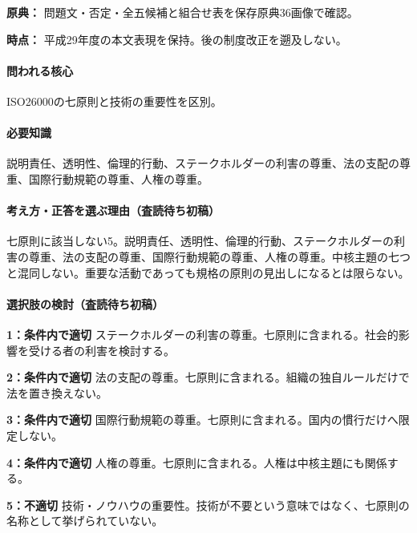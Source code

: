 \noindent\textbf{原典：} 問題文・否定・全五候補と組合せ表を保存原典36画像で確認。\par

\noindent\textbf{時点：} 平成29年度の本文表現を保持。後の制度改正を遡及しない。\par

\paragraph{問われる核心} ISO26000の七原則と技術の重要性を区別。

\paragraph{必要知識} 説明責任、透明性、倫理的行動、ステークホルダーの利害の尊重、法の支配の尊重、国際行動規範の尊重、人権の尊重。

\paragraph{考え方・正答を選ぶ理由（査読待ち初稿）} 七原則に該当しない5。説明責任、透明性、倫理的行動、ステークホルダーの利害の尊重、法の支配の尊重、国際行動規範の尊重、人権の尊重。中核主題の七つと混同しない。重要な活動であっても規格の原則の見出しになるとは限らない。

\paragraph{選択肢の検討（査読待ち初稿）}\mbox{}\par

\noindent\textbf{1：条件内で適切} ステークホルダーの利害の尊重。七原則に含まれる。社会的影響を受ける者の利害を検討する。\par

\noindent\textbf{2：条件内で適切} 法の支配の尊重。七原則に含まれる。組織の独自ルールだけで法を置き換えない。\par

\noindent\textbf{3：条件内で適切} 国際行動規範の尊重。七原則に含まれる。国内の慣行だけへ限定しない。\par

\noindent\textbf{4：条件内で適切} 人権の尊重。七原則に含まれる。人権は中核主題にも関係する。\par

\noindent\textbf{5：不適切} 技術・ノウハウの重要性。技術が不要という意味ではなく、七原則の名称として挙げられていない。\par

